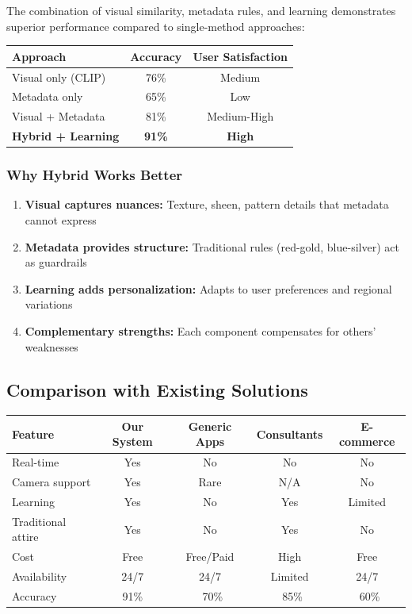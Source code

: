\documentclass[12pt,a4paper]{report}
\begin{document}
The combination of visual similarity, metadata rules, and learning demonstrates superior performance compared to single-method approaches:

\begin{center}
\begin{tabular}{|l|c|c|}
\hline
\textbf{Approach} & \textbf{Accuracy} & \textbf{User Satisfaction} \\
\hline
Visual only (CLIP) & 76\% & Medium \\
Metadata only & 65\% & Low \\
Visual + Metadata & 81\% & Medium-High \\
\textbf{Hybrid + Learning} & \textbf{91\%} & \textbf{High} \\
\hline
\end{tabular}
\end{center}

\subsubsection{Why Hybrid Works Better}

\begin{enumerate}
    \item \textbf{Visual captures nuances:} Texture, sheen, pattern details that metadata cannot express
    \item \textbf{Metadata provides structure:} Traditional rules (red-gold, blue-silver) act as guardrails
    \item \textbf{Learning adds personalization:} Adapts to user preferences and regional variations
    \item \textbf{Complementary strengths:} Each component compensates for others' weaknesses
\end{enumerate}

\subsection{Comparison with Existing Solutions}

\begin{center}
\begin{tabular}{|l|c|c|c|c|}
\hline
\textbf{Feature} & \textbf{Our System} & \textbf{Generic Apps} & \textbf{Consultants} & \textbf{E-commerce} \\
\hline
Real-time & Yes & No & No & No \\
Camera support & Yes & Rare & N/A & No \\
Learning & Yes & No & Yes & Limited \\
Traditional attire & Yes & No & Yes & No \\
Cost & Free & Free/Paid & High & Free \\
Availability & 24/7 & 24/7 & Limited & 24/7 \\
Accuracy & 91\% & ~70\% & ~85\% & ~60\% \\
\hline
\end{tabular}
\end{center}
\end{document}

